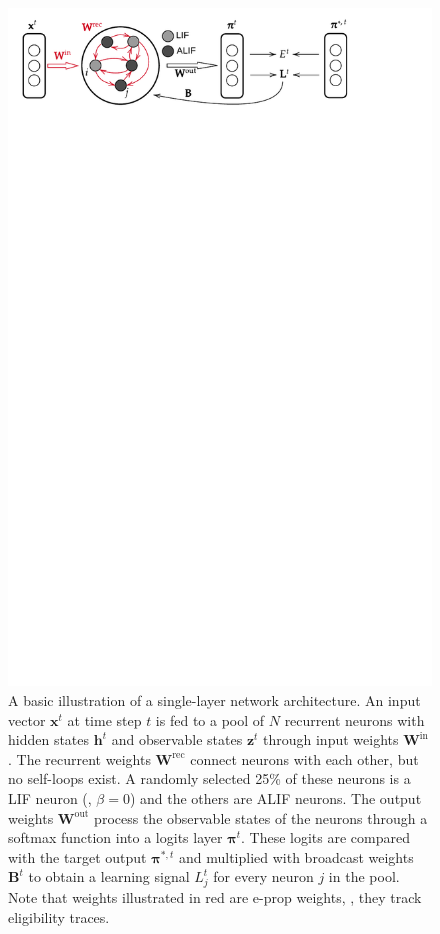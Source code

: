         \begin{figure}[!ht]
            \myfloatalign
            \includegraphics[trim=0 25cm 0 0, clip, width=\linewidth]{gfx/Singlelayer}\caption[Single-layer illustration.]{A basic illustration of a single-layer network architecture.
            An input vector $\mathbf{x}^t$ at time step $t$ is fed to a pool of $N$ recurrent neurons with hidden states $\mathbf{h}^t$ and observable states $\mathbf{z}^t$ through input weights $\mathbf{W}^\text{in}$. The recurrent weights $\mathbf{W}^\text{rec}$ connect neurons with each other, but no self-loops exist. A randomly selected 25\% of these neurons is a LIF neuron (\ie, $\beta = 0$) and the others are ALIF neurons. The output weights $\mathbf{W}^\text{out}$ process the observable states of the neurons through a softmax function into a logits layer $\mathbf{\pi}^t$. These logits are compared with the target output $\mathbf{\pi}^{*, t}$ and multiplied with broadcast weights $\mathbf{B}^t$ to obtain a learning signal $L_j^t$ for every neuron $j$ in the pool. Note that weights illustrated in red are e-prop weights, \ie, they track eligibility traces.}
            \label{fig:topology-sl}
          \end{figure}

